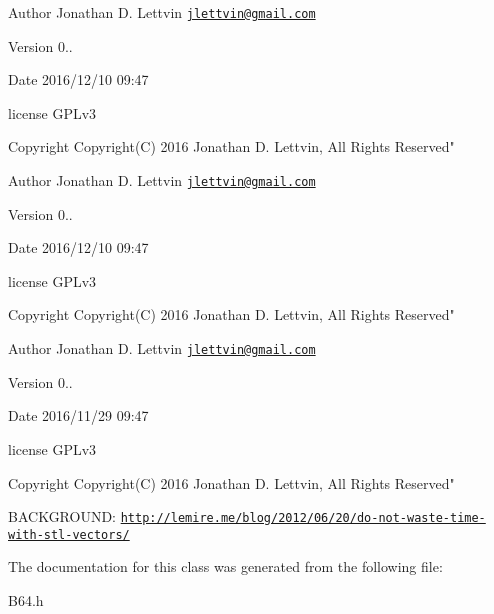 \begin{DoxyAuthor}{Author}
Jonathan D. Lettvin \href{mailto:jlettvin@gmail.com}{\tt jlettvin@gmail.\+com}
\end{DoxyAuthor}
\begin{DoxyVersion}{Version}
0..
\end{DoxyVersion}
\begin{DoxyDate}{Date}
2016/12/10 09\+:47
\end{DoxyDate}
license G\+P\+Lv3

\begin{DoxyCopyright}{Copyright}
Copyright(\+C) 2016 Jonathan D. Lettvin, All Rights Reserved"
\end{DoxyCopyright}
\begin{DoxyAuthor}{Author}
Jonathan D. Lettvin \href{mailto:jlettvin@gmail.com}{\tt jlettvin@gmail.\+com}
\end{DoxyAuthor}
\begin{DoxyVersion}{Version}
0..
\end{DoxyVersion}
\begin{DoxyDate}{Date}
2016/12/10 09\+:47
\end{DoxyDate}
license G\+P\+Lv3

\begin{DoxyCopyright}{Copyright}
Copyright(\+C) 2016 Jonathan D. Lettvin, All Rights Reserved"
\end{DoxyCopyright}
\begin{DoxyAuthor}{Author}
Jonathan D. Lettvin \href{mailto:jlettvin@gmail.com}{\tt jlettvin@gmail.\+com}
\end{DoxyAuthor}
\begin{DoxyVersion}{Version}
0..
\end{DoxyVersion}
\begin{DoxyDate}{Date}
2016/11/29 09\+:47
\end{DoxyDate}
license G\+P\+Lv3

\begin{DoxyCopyright}{Copyright}
Copyright(\+C) 2016 Jonathan D. Lettvin, All Rights Reserved"
\end{DoxyCopyright}
B\+A\+C\+K\+G\+R\+O\+U\+N\+D\+: \href{http://lemire.me/blog/2012/06/20/do-not-waste-time-with-stl-vectors/}{\tt http\+://lemire.\+me/blog/2012/06/20/do-\/not-\/waste-\/time-\/with-\/stl-\/vectors/} 

The documentation for this class was generated from the following file\+:\begin{DoxyCompactItemize}
\item 
B64.\+h\end{DoxyCompactItemize}
